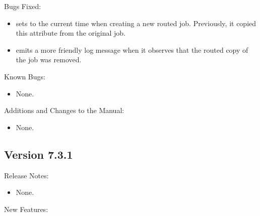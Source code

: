 \noindent Bugs Fixed:

\begin{itemize}

\item {} sets  to the current
time when creating a new routed job.  Previously, it copied this attribute
from the original job.

\item {} emits a more friendly log message when it
observes that the routed copy of the job was removed.

\end{itemize}

\noindent Known Bugs:

\begin{itemize}

\item None.

\end{itemize}

\noindent Additions and Changes to the Manual:

\begin{itemize}

\item None.

\end{itemize}


\subsection*{\label{sec:New-7-3-1}Version 7.3.1}

\noindent Release Notes:

\begin{itemize}

\item None.

\end{itemize}


\noindent New Features:

